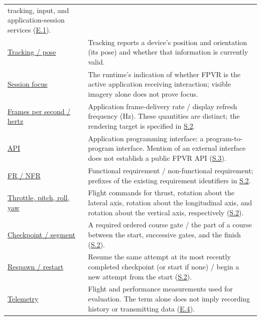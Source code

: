 \documentclass[12pt]{article}
\begin{document}
\begin{longtable}{@{}>{\raggedright\arraybackslash}p{}
                         >{\raggedright\arraybackslash}p{}@{}}
tracking, input, and application-session services (\hyperref[e1]{E.1}). \\
\hyperlink{gl:Tracking}{Tracking / pose}\hypertarget{glos:Tracking}{} & Tracking reports a device's position and orientation (its
pose) and whether that information is currently valid. \\
\hyperlink{gl:Focus}{Session focus}\hypertarget{glos:Focus}{} & The runtime's indication of whether FPVR is the active
application receiving interaction; visible imagery alone does not prove focus. \\
\hyperlink{gl:FPS}{Frames per second / hertz}\hypertarget{glos:FPS}{} & Application frame-delivery rate / display refresh
frequency (Hz). These quantities are distinct; the rendering target is specified
in \hyperref[sec:s2-nfr]{S.2}. \\
\hyperlink{gl:API}{API}\hypertarget{glos:API}{} & Application programming interface: a program-to-program interface.
Mention of an external interface does not establish a public FPVR API
(\hyperref[s3]{S.3}). \\
\hyperlink{req:FR-FLT-01}{FR / NFR}\hypertarget{glos:FRNFR}{} & Functional requirement / non-functional requirement; prefixes of the
existing requirement identifiers in \hyperref[s2]{S.2}. \\
\hyperlink{gl:Throttle}{Throttle, pitch, roll, yaw}\hypertarget{glos:Throttle}{} & Flight commands for thrust, rotation about the
lateral axis, rotation about the longitudinal axis, and rotation about the
vertical axis, respectively (\hyperref[sec:s2-flight]{S.2}). \\
\hyperlink{gl:Checkpoint}{Checkpoint / segment}\hypertarget{glos:Checkpoint}{} & A required ordered course gate / the part of a course
between the start, successive gates, and the finish
(\hyperref[sec:s2-checkpoints]{S.2}). \\
\hyperlink{gl:Respawn}{Respawn / restart}\hypertarget{glos:Respawn}{} & Resume the same attempt at its most recently completed checkpoint
(or start if none) / begin a new attempt from the start
(\hyperref[sec:s2-checkpoints]{S.2}). \\
\hyperlink{gl:Telemetry}{Telemetry}\hypertarget{glos:Telemetry}{} & Flight and performance measurements used for evaluation. The term
alone does not imply recording history or transmitting data
(\hyperref[e4]{E.4}). \\
\end{longtable}
\endgroup

\clearpage
\end{document}
